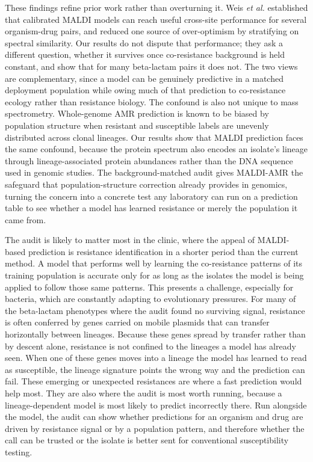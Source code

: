 \documentclass[11pt]{article}
\begin{document}
These findings refine prior work rather than overturning it. Weis \textit{et al.} established that calibrated MALDI models can reach useful cross-site performance for several organism-drug pairs, and reduced one source of over-optimism by stratifying on spectral similarity\cite{weis2022driams,weis2022stratification}. Our results do not dispute that performance; they ask a different question, whether it survives once co-resistance background is held constant, and show that for many beta-lactam pairs it does not. The two views are complementary, since a model can be genuinely predictive in a matched deployment population while owing much of that prediction to co-resistance ecology rather than resistance biology. The confound is also not unique to mass spectrometry. Whole-genome AMR prediction is known to be biased by population structure when resistant and susceptible labels are unevenly distributed across clonal lineages\cite{earle2016bacterialGwas,yu2025population}. Our results show that MALDI prediction faces the same confound, because the protein spectrum also encodes an isolate's lineage through lineage-associated protein abundances rather than the DNA sequence used in genomic studies. The background-matched audit gives MALDI-AMR the safeguard that population-structure correction already provides in genomics, turning the concern into a concrete test any laboratory can run on a prediction table to see whether a model has learned resistance or merely the population it came from.

The audit is likely to matter most in the clinic, where the appeal of MALDI-based prediction is resistance identification in a shorter period than the current method. A model that performs well by learning the co-resistance patterns of its training population is accurate only for as long as the isolates the model is being applied to follow those same patterns. This presents a challenge, especially for bacteria, which are constantly adapting to evolutionary pressures. For many of the beta-lactam phenotypes where the audit found no surviving signal, resistance is often conferred by genes carried on mobile plasmids that can transfer horizontally between lineages. Because these genes spread by transfer rather than by descent alone, resistance is not confined to the lineages a model has already seen. When one of these genes moves into a lineage the model has learned to read as susceptible, the lineage signature points the wrong way and the prediction can fail. These emerging or unexpected resistances are where a fast prediction would help most. They are also where the audit is most worth running, because a lineage-dependent model is most likely to predict incorrectly there. Run alongside the model, the audit can show whether predictions for an organism and drug are driven by resistance signal or by a population pattern, and therefore whether the call can be trusted or the isolate is better sent for conventional susceptibility testing.
\end{document}
